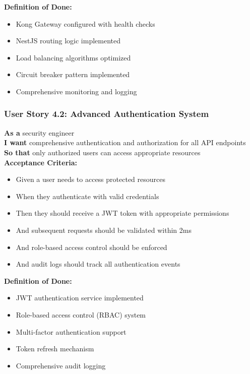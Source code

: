 \begin{table}[H]
\begin{tcolorbox}[colback=lightgray, colframe=primaryblue, title=US-4.1: Intelligent Request Routing]
\textbf{Definition of Done:}
\begin{itemize}
    \item Kong Gateway configured with health checks
    \item NestJS routing logic implemented
    \item Load balancing algorithms optimized
    \item Circuit breaker pattern implemented
    \item Comprehensive monitoring and logging
\end{itemize}
\end{tcolorbox}

\subsubsection{User Story 4.2: Advanced Authentication System}

\begin{tcolorbox}[colback=lightgray, colframe=primaryblue, title=US-4.2: Advanced Authentication System]
\textbf{As a} security engineer \\
\textbf{I want} comprehensive authentication and authorization for all API endpoints \\
\textbf{So that} only authorized users can access appropriate resources \\

\textbf{Acceptance Criteria:}
\begin{itemize}
    \item Given a user needs to access protected resources
    \item When they authenticate with valid credentials
    \item Then they should receive a JWT token with appropriate permissions
    \item And subsequent requests should be validated within 2ms
    \item And role-based access control should be enforced
    \item And audit logs should track all authentication events
\end{itemize}

\textbf{Definition of Done:}
\begin{itemize}
    \item JWT authentication service implemented
    \item Role-based access control (RBAC) system
    \item Multi-factor authentication support
    \item Token refresh mechanism
    \item Comprehensive audit logging
\end{itemize}
\end{tcolorbox}


\end{table}
